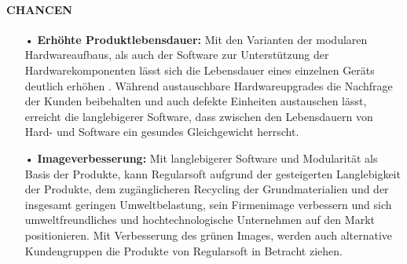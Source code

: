 \documentclass[13pt,titlepage]{article}
\begin{document}
\paragraph{CHANCEN}
\begin{itemize}
\item[•] \textbf{Erhöhte Produktlebensdauer:}
Mit den Varianten der modularen Hardwareaufbaus, als auch der Software zur Unterstützung der Hardwarekomponenten lässt sich die Lebensdauer eines einzelnen Geräts deutlich erhöhen \cite{mpd}. Während austauschbare Hardwareupgrades die Nachfrage der Kunden beibehalten und auch defekte Einheiten austauschen lässt, erreicht die langlebigerer Software, dass zwischen den Lebensdauern von Hard- und Software ein gesundes Gleichgewicht herrscht.

\item[•] \textbf{Imageverbesserung:}
Mit langlebigerer Software und Modularität als Basis der Produkte, kann Regularsoft aufgrund der gesteigerten Langlebigkeit der Produkte, dem zugänglicheren Recycling der Grundmaterialien und der insgesamt geringen Umweltbelastung, sein Firmenimage verbessern und sich umweltfreundliches und hochtechnologische Unternehmen auf den Markt positionieren. Mit Verbesserung des  grünen Images, werden auch alternative Kundengruppen die Produkte von Regularsoft in Betracht ziehen.
\end{itemize}
\end{document}
